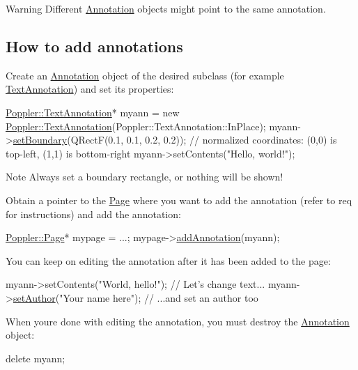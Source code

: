\begin{DoxyWarning}{Warning}
Different \hyperlink{class_poppler_1_1_annotation}{Annotation} objects might point to the same annotation.
\end{DoxyWarning}
\hypertarget{class_poppler_1_1_annotation_annotCreation}{}\subsection{How to add annotations}\label{class_poppler_1_1_annotation_annotCreation}
Create an \hyperlink{class_poppler_1_1_annotation}{Annotation} object of the desired subclass (for example \hyperlink{class_poppler_1_1_text_annotation}{Text\+Annotation}) and set its properties\+: 
\begin{DoxyCode}
\hyperlink{class_poppler_1_1_text_annotation}{Poppler::TextAnnotation}* myann = \textcolor{keyword}{new} 
      \hyperlink{class_poppler_1_1_text_annotation}{Poppler::TextAnnotation}(Poppler::TextAnnotation::InPlace);
myann->\hyperlink{class_poppler_1_1_annotation_ad7632d611ff26ec76cc42d301d2296e9}{setBoundary}(QRectF(0.1, 0.1, 0.2, 0.2)); \textcolor{comment}{// normalized coordinates: (0,0) is top-left,
       (1,1) is bottom-right}
myann->setContents(\textcolor{stringliteral}{"Hello, world!"});
\end{DoxyCode}
 \begin{DoxyNote}{Note}
Always set a boundary rectangle, or nothing will be shown!
\end{DoxyNote}
Obtain a pointer to the \hyperlink{class_poppler_1_1_page}{Page} where you want to add the annotation (refer to req for instructions) and add the annotation\+: 
\begin{DoxyCode}
\hyperlink{class_poppler_1_1_page}{Poppler::Page}* mypage = ...;
mypage->\hyperlink{class_poppler_1_1_page_a1235aa9d06e6f66c38f9bab4ac6a5bef}{addAnnotation}(myann);
\end{DoxyCode}


You can keep on editing the annotation after it has been added to the page\+: 
\begin{DoxyCode}
myann->setContents(\textcolor{stringliteral}{"World, hello!"}); \textcolor{comment}{// Let's change text...}
myann->\hyperlink{class_poppler_1_1_annotation_a519a5f64785bf1381921f6f62dded881}{setAuthor}(\textcolor{stringliteral}{"Your name here"});  \textcolor{comment}{// ...and set an author too}
\end{DoxyCode}


When you\textquotesingle{}re done with editing the annotation, you must destroy the \hyperlink{class_poppler_1_1_annotation}{Annotation} object\+: 
\begin{DoxyCode}
\textcolor{keyword}{delete} myann;
\end{DoxyCode}


